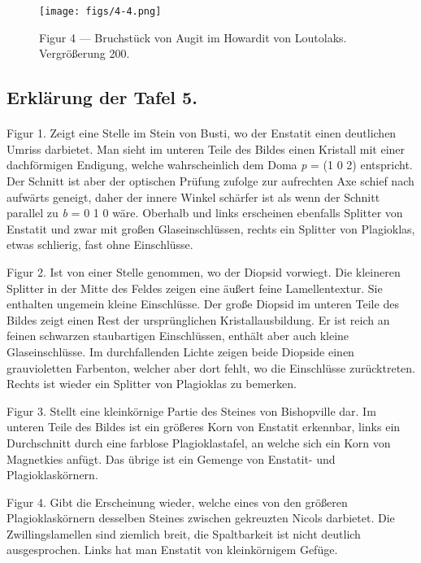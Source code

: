 \documentclass[a4paper, 12pt, oneside]{article}
\begin{document}
\vspace*{\fill}
\begin{figure}[H]
\centering
\texttt{[image: figs/4-4.png]}
\caption{\small Figur 4 --- Bruchstück von Augit im Howardit von Loutolaks. Vergrößerung 200.}
\end{figure}
\vspace*{\fill}
\clearpage

\subsection{Erklärung der Tafel 5.}
\paragraph{}
Figur 1. Zeigt eine Stelle im Stein von Busti, wo der Enstatit einen deutlichen Umriss darbietet. Man sieht im unteren Teile des Bildes einen Kristall mit einer dachförmigen Endigung, welche wahrscheinlich dem Doma \emph{p} = (1 0 2) entspricht. Der Schnitt ist aber der optischen Prüfung zufolge zur aufrechten Axe schief nach aufwärts geneigt, daher der innere Winkel schärfer ist als wenn der Schnitt parallel zu \emph{b} = 0 1 0 wäre. Oberhalb und links erscheinen ebenfalls Splitter von Enstatit und zwar mit großen Glaseinschlüssen, rechts ein Splitter von Plagioklas, etwas schlierig, fast ohne Einschlüsse.

Figur 2. Ist von einer Stelle genommen, wo der Diopsid vorwiegt. Die kleineren Splitter in der Mitte des Feldes zeigen eine äußert feine Lamellentextur. Sie enthalten ungemein kleine Einschlüsse. Der große Diopsid im unteren Teile des Bildes zeigt einen Rest der ursprünglichen Kristallausbildung. Er ist reich an feinen schwarzen staubartigen Einschlüssen, enthält aber auch kleine Glaseinschlüsse. Im durchfallenden Lichte zeigen beide Diopside einen grauvioletten Farbenton, welcher aber dort fehlt, wo die Einschlüsse zurücktreten. Rechts ist wieder ein Splitter von Plagioklas zu bemerken.

Figur 3. Stellt eine kleinkörnige Partie des Steines von Bishopville dar. Im unteren Teile des Bildes ist ein größeres Korn von Enstatit erkennbar, links ein Durchschnitt durch eine farblose Plagioklastafel, an welche sich ein Korn von Magnetkies anfügt. Das übrige ist ein Gemenge von Enstatit- und Plagioklaskörnern.

Figur 4. Gibt die Erscheinung wieder, welche eines von den größeren Plagioklaskörnern desselben Steines zwischen gekreuzten Nicols darbietet. Die Zwillingslamellen sind ziemlich breit, die Spaltbarkeit ist nicht deutlich ausgesprochen. Links hat man Enstatit von kleinkörnigem Gefüge.
\clearpage
\end{document}
